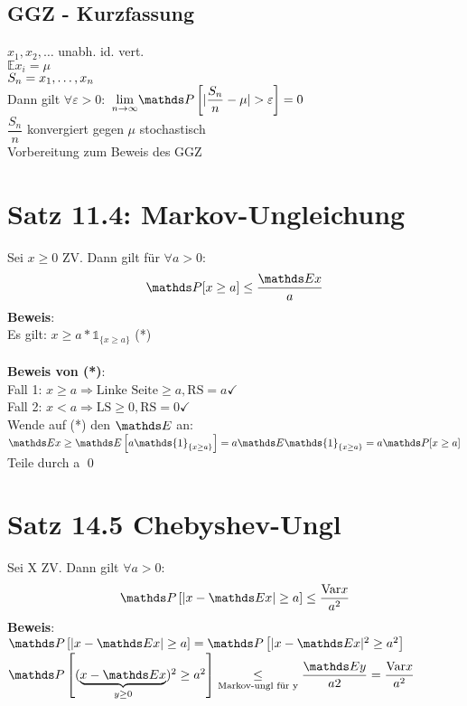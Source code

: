 \subsection{GGZ - Kurzfassung}
$x_1,x_2,\dots$ unabh. id. vert.\smallskip\\
$\mathds{E}x_i = \mu $\\
$S_n = x_1,\dots,x_n$\smallskip\\
Dann gilt $ \forall \varepsilon > 0: $\smallskip
$\limntoinf \PP \left[\vert \dfrac{S_n}{n}-\mu\vert > \varepsilon\right] = 0$\smallskip\\
$\dfrac{S_n}{n}$ konvergiert gegen $\mu$ stochastisch\medskip\\
Vorbereitung zum Beweis des GGZ
\section{Satz 11.4: Markov-Ungleichung}
Sei $x\geq 0$ ZV. Dann gilt für $\forall a > 0$:\smallskip\\
$$\PP[x \geq a ] \leq \dfrac{\E x}{a}$$
\textbf{Beweis}:\\
Es gilt: $x \geq a*\mathds{1}_{\{x\geq a\}}$ (*)\smallskip\\
\medskip\\
\textbf{Beweis von (*)}:\\
Fall 1: $x \geq a \Rightarrow \text{Linke Seite} \geq a, \text{RS} = a \checkmark$\medskip\\
Fall 2: $x < a \Rightarrow \text{LS} \geq 0, \text{RS} = 0 \checkmark$\medskip\\
Wende auf (*) den $\E$ an:\\
$\E x \geq \E \left[a\mathds{1}_{\{x \geq a\}}\right] = a \E \mathds{1}_{\{x\geq a\}} = a\PP [x \geq a]$\smallskip\\
Teile durch a \qed
\section{Satz 14.5 Chebyshev-Ungl}
Sei X ZV. Dann gilt $\forall a > 0$:
$$\PP\left[\vert x - \E x\vert \geq a \right] \leq \dfrac{\var x}{a^2}$$
\textbf{Beweis}: \\
$\PP \left[\vert x-\E x\vert \geq a\right] = \PP \left[\vert x-\E x\vert^2 \geq a^2\right] $\smallskip\\
$\PP\left[(\underbrace{x-\E x}_{y\geq 0} )^2\geq a^2\right] \underset{\text{Markov-ungl für y}}{\leq}\dfrac{\E y}{a 2}=\dfrac{\var x}{a^2}$\medskip\\
